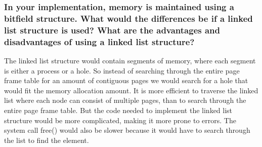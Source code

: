 \subsubsection*{In your implementation, memory is maintained using a bitfield structure. What would the differences be if a linked list structure is used? What are the advantages and disadvantages of using a linked list structure?}
The linked list structure would contain segments of memory, where each segment is either a process or a hole. So instead of searching through the entire page frame table for an amount of contiguous pages we would search for a hole that would fit the memory allocation amount. It is more efficient to traverse the linked list where each node can consist of multiple pages, than to search through the entire page frame table. But the code needed to implement the linked list structure would be more complicated, making it more prone to errors. The system call free() would also be slower because it would have to search through the list to find the element.